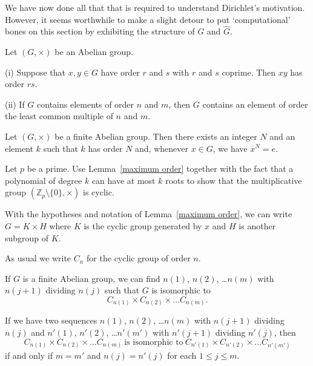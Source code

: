 We have now done all that that is required to
understand Dirichlet's motivation. However, it
seems worthwhile to make a slight detour to
put `computational' bones on this section by
exhibiting the structure of $G$ and $\hat{G}$.
\begin{lemma} Let $(G,\times)$ be an Abelian group.

(i) Suppose that $x,y\in G$ have order $r$ and $s$
with $r$ and $s$ coprime. Then $xy$ has order $rs$.

(ii) If $G$ contains elements of order $n$ and $m$,
then $G$ contains an element of order the least
common multiple of $n$ and $m$.
\end{lemma}
\begin{lemma}\label{maximum order}
Let $(G,\times)$ be a finite Abelian group.
Then there exists an integer $N$ and an element $k$
such that $k$ has order $N$ and, whenever $x\in G$,
we have $x^{N}=e$.
\end{lemma}
\begin{exercise}\label{cyclic in field}
Let $p$ be a prime.
Use Lemma~\ref{maximum order}
together with the fact that a polynomial of degree
$k$ can have at most $k$ roots to show that the
multiplicative group $({\mathbb Z}_{p}\setminus\{0\},\times)$
is cyclic.
\end{exercise}
\begin{lemma} With the hypotheses and notation
of Lemma~\ref{maximum order}, we can write $G=K\times H$
where $K$ is the cyclic group generated by $x$
and $H$ is another subgroup of $K$.
\end{lemma}
As usual we write $C_{n}$ for the cyclic group
of order $n$.
\begin{theorem} If $G$ is a finite Abelian group, we can find
$n(1)$, $n(2)$, \dots $n(m)$ with $n(j+1)$ dividing $n(j)$
such that $G$ is isomorphic to
\[C_{n(1)}\times C_{n(2)}\times \dots C_{n(m)}.\]
\end{theorem}
\begin{lemma} If we have two sequences
$n(1)$, $n(2)$, \dots $n(m)$ with $n(j+1)$ dividing $n(j)$
and
$n'(1)$, $n'(2)$, \dots $n'(m')$ with $n'(j+1)$ dividing $n'(j)$,
then
\[C_{n(1)}\times C_{n(2)}\times \dots C_{n(m)}
\ \text{is isomorphic to}
\ C_{n'(1)}\times C_{n'(2)}\times \dots C_{n'(m')}\]
if and only if $m=m'$ and $n(j)=n'(j)$ for each $1\leq j\leq m$.
\end{lemma}

